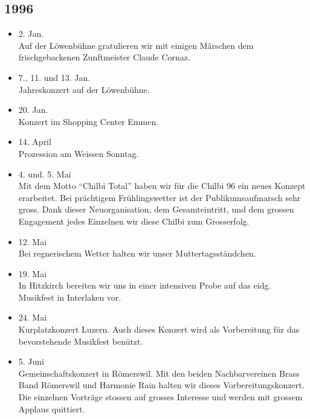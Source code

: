 \subsection*{1996}

\begin{history}


    \begin{itemize}

        \item 2. Jan.\\
              Auf der Löwenbühne gratulieren wir mit einigen Märschen dem
              frischgebackenen Zunftmeister Claude Cornaz.

        \item 7., 11. und 13. Jan.\\
              Jahreskonzert auf der Löwenbühne.

        \item 20. Jan.\\
              Konzert im Shopping Center Emmen.

        \item 14. April\\
              Prozession am Weissen Sonntag.

        \item 4. und. 5. Mai\\
              Mit dem Motto \enquote{Chilbi Total} haben wir für die Chilbi 96 ein
              neues Konzept erarbeitet. Bei prächtigem Frühlingswetter ist der
              Publikumsaufmarsch sehr gross. Dank dieser Neuorganisation, dem
              Gesamteintritt, und dem grossen Engagement jedes Einzelnen wir diese
              Chilbi zum Grosserfolg.

        \item 12. Mai\\
              Bei regnerischem Wetter halten wir unser Muttertagsständchen.

        \item 19. Mai\\
              In Hitzkirch bereiten wir uns in einer intensiven Probe auf das eidg.
              Musikfest in Interlaken vor.

        \item 24. Mai\\
              Kurplatzkonzert Luzern. Auch dieses Konzert wird als Vorbereitung für
              das bevorstehende Musikfest benützt.

        \item 5. Juni\\
              Gemeinschaftskonzert in Römerswil. Mit den beiden Nachbarvereinen Brass
              Band Römerswil und Harmonie Rain halten wir dieses Vorbereitungskonzert.
              Die einzelnen Vorträge stossen auf grosses Interesse und werden mit
              grossem Applaus quittiert.


\end{itemize}
\end{history}
